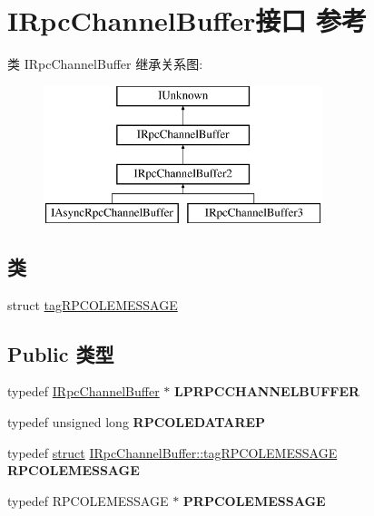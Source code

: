 \hypertarget{interface_i_rpc_channel_buffer}{}\section{I\+Rpc\+Channel\+Buffer接口 参考}
\label{interface_i_rpc_channel_buffer}
类 I\+Rpc\+Channel\+Buffer 继承关系图\+:\begin{figure}[H]
\begin{center}
\leavevmode
\includegraphics[height=4.000000cm]{interface_i_rpc_channel_buffer}
\end{center}
\end{figure}
\subsection*{类}
\begin{DoxyCompactItemize}
\item 
struct \hyperlink{struct_i_rpc_channel_buffer_1_1tag_r_p_c_o_l_e_m_e_s_s_a_g_e}{tag\+R\+P\+C\+O\+L\+E\+M\+E\+S\+S\+A\+GE}
\end{DoxyCompactItemize}
\subsection*{Public 类型}
\begin{DoxyCompactItemize}
\item 
\mbox{\label{interface_i_rpc_channel_buffer_ad28ecb8b186511f34bf774d94d670cd4}} 
typedef \hyperlink{interface_i_rpc_channel_buffer}{I\+Rpc\+Channel\+Buffer} $\ast$ {\bfseries L\+P\+R\+P\+C\+C\+H\+A\+N\+N\+E\+L\+B\+U\+F\+F\+ER}
\item 
\mbox{\label{interface_i_rpc_channel_buffer_aa834b0cc31368d53a8c2f356acf563cb}} 
typedef unsigned long {\bfseries R\+P\+C\+O\+L\+E\+D\+A\+T\+A\+R\+EP}
\item 
\mbox{\label{interface_i_rpc_channel_buffer_aac5ed495700349bd2fd33d5f3b7e6150}} 
typedef \hyperlink{interfacestruct}{struct} \hyperlink{struct_i_rpc_channel_buffer_1_1tag_r_p_c_o_l_e_m_e_s_s_a_g_e}{I\+Rpc\+Channel\+Buffer\+::tag\+R\+P\+C\+O\+L\+E\+M\+E\+S\+S\+A\+GE} {\bfseries R\+P\+C\+O\+L\+E\+M\+E\+S\+S\+A\+GE}
\item 
\mbox{\label{interface_i_rpc_channel_buffer_a38966094d92b2c004905a691382c1652}} 
typedef R\+P\+C\+O\+L\+E\+M\+E\+S\+S\+A\+GE $\ast$ {\bfseries P\+R\+P\+C\+O\+L\+E\+M\+E\+S\+S\+A\+GE}
\end{DoxyCompactItemize}
